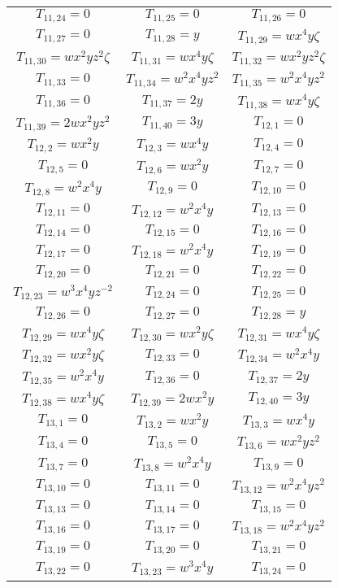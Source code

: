 \documentclass[12pt]{memoireuqam1.3}
\begin{document}
\begin{longtable}{|c|c|c|}
$T_{11,24}= 0$&
$T_{11,25}= 0$&
$T_{11,26}= 0$\\
$T_{11,27}= 0$&
$T_{11,28}= y$&
$T_{11,29}= wx^4y\zeta$\\
$T_{11,30}= wx^2yz^2\zeta$&
$T_{11,31}= wx^4y\zeta$&
$T_{11,32}= wx^2yz^2\zeta$\\
$T_{11,33}= 0$&
$T_{11,34}= w^2x^4yz^2$&
$T_{11,35}= w^2x^4yz^2$\\
$T_{11,36}= 0$&
$T_{11,37}= 2y$&
$T_{11,38}= wx^4y\zeta$\\
$T_{11,39}= 2wx^2yz^2$&
$T_{11,40}= 3y$&
$T_{12,1}= 0$\\
$T_{12,2}= wx^2y$&
$T_{12,3}= wx^4y$&
$T_{12,4}= 0$\\
$T_{12,5}= 0$&
$T_{12,6}= wx^2y$&
$T_{12,7}= 0$\\
$T_{12,8}= w^2x^4y$&
$T_{12,9}= 0$&
$T_{12,10}= 0$\\
$T_{12,11}= 0$&
$T_{12,12}= w^2x^4y$&
$T_{12,13}= 0$\\
$T_{12,14}= 0$&
$T_{12,15}= 0$&
$T_{12,16}= 0$\\
$T_{12,17}= 0$&
$T_{12,18}= w^2x^4y$&
$T_{12,19}= 0$\\
$T_{12,20}= 0$&
$T_{12,21}= 0$&
$T_{12,22}= 0$\\
$T_{12,23}= w^3x^4yz^{-2}$&
$T_{12,24}= 0$&
$T_{12,25}= 0$\\
$T_{12,26}= 0$&
$T_{12,27}= 0$&
$T_{12,28}= y$\\
$T_{12,29}= wx^4y\zeta$&
$T_{12,30}= wx^2y\zeta$&
$T_{12,31}= wx^4y\zeta$\\
$T_{12,32}= wx^2y\zeta$&
$T_{12,33}= 0$&
$T_{12,34}= w^2x^4y$\\
$T_{12,35}= w^2x^4y$&
$T_{12,36}= 0$&
$T_{12,37}= 2y$\\
$T_{12,38}= wx^4y\zeta$&
$T_{12,39}= 2wx^2y$&
$T_{12,40}= 3y$\\
$T_{13,1}= 0$&
$T_{13,2}= wx^2y$&
$T_{13,3}= wx^4y$\\
$T_{13,4}= 0$&
$T_{13,5}= 0$&
$T_{13,6}= wx^2yz^2$\\
$T_{13,7}= 0$&
$T_{13,8}= w^2x^4y$&
$T_{13,9}= 0$\\
$T_{13,10}= 0$&
$T_{13,11}= 0$&
$T_{13,12}= w^2x^4yz^2$\\
$T_{13,13}= 0$&
$T_{13,14}= 0$&
$T_{13,15}= 0$\\
$T_{13,16}= 0$&
$T_{13,17}= 0$&
$T_{13,18}= w^2x^4yz^2$\\
$T_{13,19}= 0$&
$T_{13,20}= 0$&
$T_{13,21}= 0$\\
$T_{13,22}= 0$&
$T_{13,23}= w^3x^4y$&
$T_{13,24}= 0$\\

\end{longtable}
\end{document}
